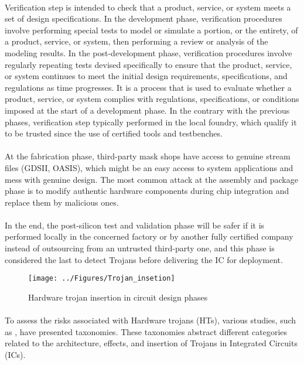\paragraph*{}
Verification step is intended to check that a product, service, or system meets a set of design specifications. In the development phase, verification procedures involve performing special tests to model or simulate a portion, or the entirety, of a product, service, or system, then performing a review or analysis of the modeling results. In the post-development phase, verification procedures involve regularly repeating tests devised specifically to ensure that the product, service, or system continues to meet the initial design requirements, specifications, and regulations as time progresses. It is a process that is used to evaluate whether a product, service, or system complies with regulations, specifications, or conditions imposed at the start of a development phase. In the contrary with the previous phases, verification step typically performed in the local foundry, which qualify it to be trusted since the use of certified tools and testbenches.
\paragraph*{}
At the fabrication phase, third-party mask shops have access to genuine stream files (GDSII, OASIS), which might be an easy access to system applications and mess with genuine design. The most common attack at the assembly and package phase is to modify authentic hardware components during chip integration and replace them by malicious ones.
\paragraph*{}
In the end, the post-silicon test and validation phase will be safer if it is performed locally in the concerned factory or by another fully certified company instead of outsourcing from an untrusted third-party one, and this phase is considered the last to detect Trojans before delivering the IC for deployment.
\begin{figure}[h]
	\centering
	\texttt{[image: ../Figures/Trojan\_insetion]}
	\caption{Hardware trojan insertion in circuit design phases}
	\label{fig:trojaninsetion}
\end{figure}

\paragraph*{}
To assess the risks associated with Hardware trojans (HTs), various studies, such as \cite{9956883}, have presented taxonomies. These taxonomies abstract different categories related to the architecture, effects, and insertion of Trojans in Integrated Circuits (ICs).

